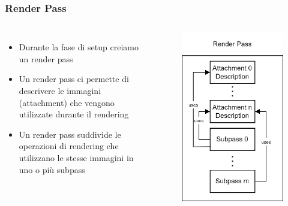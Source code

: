 \begin{frame}
\frametitle{Render Pass}
\begin{columns}


\begin{itemize}
\item Durante la fase di setup creiamo un render pass
\item Un render pass ci permette di descrivere le immagini (attachment) che vengono utilizzate durante il rendering
\item Un render pass suddivide le operazioni di rendering che utilizzano le stesse immagini in uno o più subpass
\end{itemize}


\begin{figure}[ht]
    \centering
    \includegraphics[scale=0.2]{images/SlidesClearWindow/RenderPass.png}
\end{figure}

\end{columns}
\end{frame}
